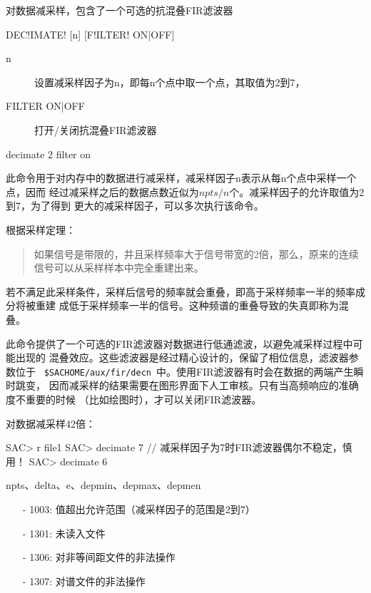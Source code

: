 \label{cmd:decimate}

对数据减采样，包含了一个可选的抗混叠FIR滤波器

\begin{SACSTX}
DEC!IMATE! [n] [F!ILTER! ON|OFF]
\end{SACSTX}

\begin{description}
\item [n] 设置减采样因子为n，即每n个点中取一个点，其取值为2到7，
\item [FILTER ON|OFF] 打开/关闭抗混叠FIR滤波器
\end{description}

\begin{SACDFT}
decimate 2 filter on
\end{SACDFT}

此命令用于对内存中的数据进行减采样，减采样因子n表示从每n个点中采样一个点，因而
经过减采样之后的数据点数近似为$npts/n$个。减采样因子的允许取值为2到7，为了得到
更大的减采样因子，可以多次执行该命令。

根据采样定理：
\begin{quote}
如果信号是带限的，并且采样频率大于信号带宽的2倍，那么，原来的连续信号可以从采样样本中完全重建出来。
\end{quote}
若不满足此采样条件，采样后信号的频率就会重叠，即高于采样频率一半的频率成分将被重建
成低于采样频率一半的信号。这种频谱的重叠导致的失真即称为混叠。

此命令提供了一个可选的FIR滤波器对数据进行低通滤波，以避免减采样过程中可能出现的
混叠效应。这些滤波器是经过精心设计的，保留了相位信息，滤波器参数位于
~\verb+$SACHOME/aux/fir/decn+~中。使用FIR滤波器有时会在数据的两端产生瞬时跳变，
因而减采样的结果需要在图形界面下人工审核。只有当高频响应的准确度不重要的时候
（比如绘图时），才可以关闭FIR滤波器。

对数据减采样42倍：
\begin{SACCode}
SAC> r file1
SAC> decimate 7     // 减采样因子为7时FIR滤波器偶尔不稳定，慎用！
SAC> decimate 6
\end{SACCode}

npts、delta、e、depmin、depmax、depmen

\begin{itemize}
\item[-]1003: 值超出允许范围（减采样因子的范围是2到7）
\item[-]1301: 未读入文件
\item[-]1306: 对非等间距文件的非法操作
\item[-]1307: 对谱文件的非法操作
\end{itemize}
